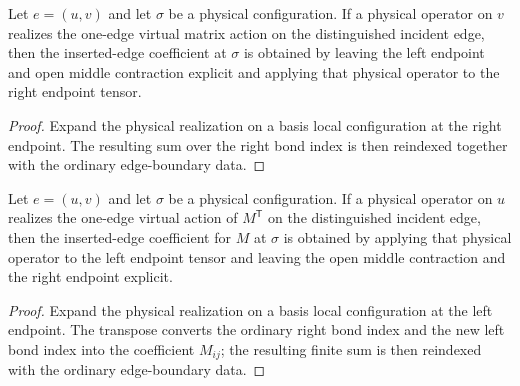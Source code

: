 \begin{theorem}%
    \label{thm:peps_edgeInsertedCoeff_rightPhysicalRealization}
    \leanok
    Let $e=(u,v)$ and let $\sigma$ be a physical configuration. If a physical
    operator on $v$ realizes the one-edge virtual matrix action on the
    distinguished incident edge, then the inserted-edge coefficient at
    $\sigma$ is obtained by leaving the left endpoint and open middle
    contraction explicit and applying that physical operator to the right
    endpoint tensor.
\end{theorem}
\begin{proof}\leanok
    Expand the physical realization on a basis local configuration at the
    right endpoint. The resulting sum over the right bond index is then
    reindexed together with the ordinary edge-boundary data.
\end{proof}

\begin{theorem}%
    \label{thm:peps_edgeInsertedCoeff_leftPhysicalRealization}
    \leanok
    Let $e=(u,v)$ and let $\sigma$ be a physical configuration. If a physical
    operator on $u$ realizes the one-edge virtual action of $M^{\mathsf T}$ on
    the distinguished incident edge, then the inserted-edge coefficient for
    $M$ at $\sigma$ is obtained by applying that physical operator to the left
    endpoint tensor and leaving the open middle contraction and the right
    endpoint explicit.
\end{theorem}
\begin{proof}\leanok
    Expand the physical realization on a basis local configuration at the left
    endpoint. The transpose converts the ordinary right bond index and the new
    left bond index into the coefficient $M_{ij}$; the resulting finite sum
    is then reindexed with the ordinary edge-boundary data.
\end{proof}


